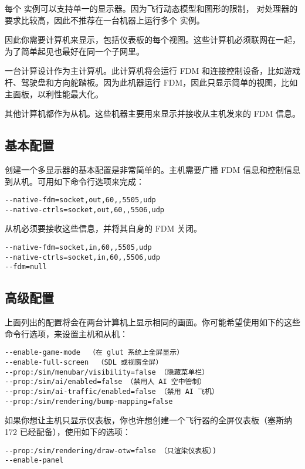 每个 \FlightGear{} 实例可以支持单一的显示器。因为飞行动态模型和图形的限制，\FlightGear{} 对处理器的要求比较高，因此不推荐在一台机器上运行多个 \FlightGear{} 实例。

因此你需要计算机来显示，包括仪表板的每个视图。这些计算机必须联网在一起，为了简单起见也最好在同一个子网里。

一台计算设计作为主计算机。此计算机将会运行 FDM 和连接控制设备，比如游戏杆、驾驶盘和方向舵踏板。因为此机器运行 FDM，因此只显示简单的视图，比如主面板，以利性能最大化。

其他计算机都作为从机。这些机器主要用来显示并接收从主机发来的 FDM 信息。

\subsection{基本配置}

创建一个多显示器的基本配置是非常简单的。主机需要广播 FDM 信息和控制信息到从机。可用如下命令行选项来完成：

\begin{verbatim}
--native-fdm=socket,out,60,,5505,udp
--native-ctrls=socket,out,60,,5506,udp
\end{verbatim}

从机必须要接收这些信息，并将其自身的 FDM 关闭。

\begin{verbatim}
--native-fdm=socket,in,60,,5505,udp
--native-ctrls=socket,in,60,,5506,udp
--fdm=null
\end{verbatim}

\subsection{高级配置}

上面列出的配置将会在两台计算机上显示相同的画面。你可能希望使用如下的这些命令行选项，来设置主机和从机：

\begin{verbatim}
--enable-game-mode  （在 glut 系统上全屏显示）
--enable-full-screen  （SDL 或视窗全屏）
--prop:/sim/menubar/visibility=false （隐藏菜单栏）
--prop:/sim/ai/enabled=false （禁用人 AI 空中管制）
--prop:/sim/ai-traffic/enabled=false （禁用 AI 飞机）
--prop:/sim/rendering/bump-mapping=false
\end{verbatim}

如果你想让主机只显示仪表板，你也许想创建一个飞行器的全屏仪表板（塞斯纳 172 已经配备），使用如下的选项：

\begin{verbatim}
--prop:/sim/rendering/draw-otw=false （只渲染仪表板）)
--enable-panel
\end{verbatim}

